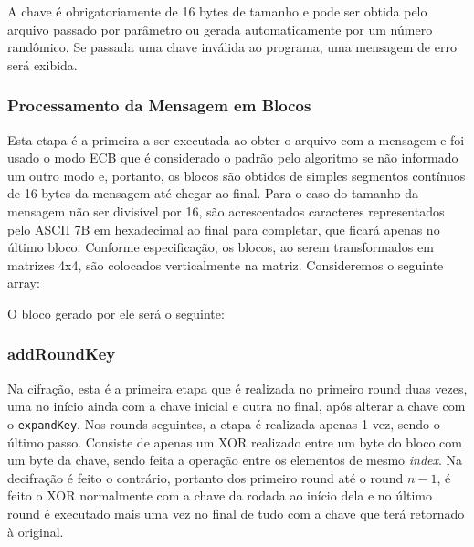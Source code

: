 \documentclass[12pt]{article}
\begin{document}
A chave é obrigatoriamente de 16 bytes de tamanho e pode ser obtida pelo arquivo passado por parâmetro ou gerada automaticamente por um número randômico. Se passada uma chave inválida ao programa, uma mensagem de erro será exibida.

\subsubsection{Processamento da Mensagem em Blocos}
Esta etapa é a primeira a ser executada ao obter o arquivo com a mensagem e foi usado o modo ECB que é considerado o padrão pelo algoritmo se não informado um outro modo e, portanto, os blocos são obtidos de simples segmentos contínuos de 16 bytes da mensagem até chegar ao final. Para o caso do tamanho da mensagem não ser divisível por 16, são acrescentados caracteres representados pelo ASCII 7B em hexadecimal ao final para completar, que ficará apenas no último bloco. Conforme especificação, os blocos, ao serem transformados em matrizes 4x4, são colocados verticalmente na matriz. Consideremos o seguinte array:

\begin{center}
\end{center}

O bloco gerado por ele será o seguinte:

\begin{center}
\end{center}

\subsubsection{addRoundKey}
Na cifração, esta é a primeira etapa que é realizada no primeiro round duas vezes, uma no início ainda com a chave inicial e outra no final, após alterar a chave com o \texttt{expandKey}. Nos rounds seguintes, a etapa é realizada apenas 1 vez, sendo o último passo. Consiste de apenas um XOR realizado entre um byte do bloco com um byte da chave, sendo feita a operação entre os elementos de mesmo \textit{index}. Na decifração é feito o contrário, portanto dos primeiro round até o round $n-1$, é feito o XOR normalmente com a chave da rodada ao início dela e no último round é executado mais uma vez no final de tudo com a chave que terá retornado à original.
\end{document}
